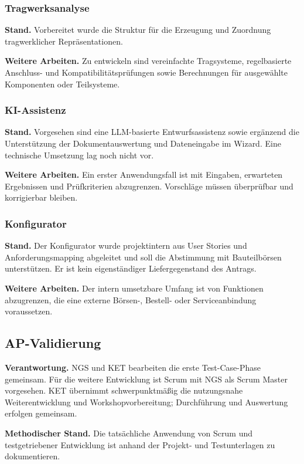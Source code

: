 \documentclass[type=zwischenbericht,theme=dark]{zukunftbau}
\begin{document}
\subsubsection{Tragwerksanalyse}

\textbf{Stand.} Vorbereitet wurde die Struktur für die Erzeugung und Zuordnung tragwerklicher Repräsentationen.

\textbf{Weitere Arbeiten.} Zu entwickeln sind vereinfachte Tragsysteme, regelbasierte Anschluss- und Kompatibilitätsprüfungen sowie Berechnungen für ausgewählte Komponenten oder Teilsysteme.

\subsubsection{KI-Assistenz}

\textbf{Stand.} Vorgesehen sind eine LLM-basierte Entwurfsassistenz sowie ergänzend die Unterstützung der Dokumentauswertung und Dateneingabe im Wizard. Eine technische Umsetzung lag noch nicht vor.

\textbf{Weitere Arbeiten.} Ein erster Anwendungsfall ist mit Eingaben, erwarteten Ergebnissen und Prüfkriterien abzugrenzen. Vorschläge müssen überprüfbar und korrigierbar bleiben.

\subsubsection{Konfigurator}

\textbf{Stand.} Der Konfigurator wurde projektintern aus User Stories und Anforderungsmapping abgeleitet und soll die Abstimmung mit Bauteilbörsen unterstützen. Er ist kein eigenständiger Liefergegenstand des Antrags.

\textbf{Weitere Arbeiten.} Der intern umsetzbare Umfang ist von Funktionen abzugrenzen, die eine externe Börsen-, Bestell- oder Serviceanbindung voraussetzen.

\subsection{AP-Validierung}

\textbf{Verantwortung.} NGS und KET bearbeiten die erste Test-Case-Phase gemeinsam. Für die weitere Entwicklung ist Scrum mit NGS als Scrum Master vorgesehen. KET übernimmt schwerpunktmäßig die nutzungsnahe Weiterentwicklung und Workshopvorbereitung; Durchführung und Auswertung erfolgen gemeinsam.

\textbf{Methodischer Stand.} Die tatsächliche Anwendung von Scrum und testgetriebener Entwicklung ist anhand der Projekt- und Testunterlagen zu dokumentieren.
\end{document}
